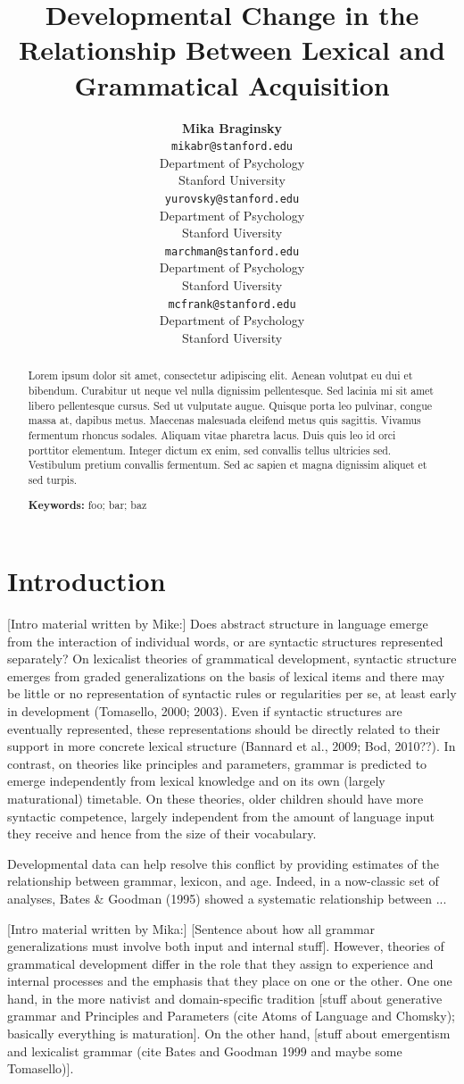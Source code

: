 \documentclass[10pt,letterpaper]{article}
\title{Developmental Change in the Relationship Between Lexical and Grammatical Acquisition}
\author{{\large \bf Mika Braginsky} \\
  \texttt{mikabr@stanford.edu} \\
  Department of Psychology \\
  Stanford University
  \And {\large \bf Daniel Yurovsky} \\
  \texttt{yurovsky@stanford.edu} \\
  Department of Psychology \\
  Stanford Uiversity
    \And {\large \bf Virginia Marchman} \\
    \texttt{marchman@stanford.edu} \\
  Department of Psychology \\
  Stanford Uiversity
    \And {\large \bf Michael C. Frank}\\
    \texttt{mcfrank@stanford.edu} \\
  Department of Psychology \\
  Stanford Uiversity}
\begin{document}
\maketitle

\begin{abstract}
Lorem ipsum dolor sit amet, consectetur adipiscing elit. Aenean volutpat eu dui et bibendum. Curabitur ut neque vel nulla dignissim pellentesque. Sed lacinia mi sit amet libero pellentesque cursus. Sed ut vulputate augue. Quisque porta leo pulvinar, congue massa at, dapibus metus. Maecenas malesuada eleifend metus quis sagittis. Vivamus fermentum rhoncus sodales. Aliquam vitae pharetra lacus. Duis quis leo id orci porttitor elementum. Integer dictum ex enim, sed convallis tellus ultricies sed. Vestibulum pretium convallis fermentum. Sed ac sapien et magna dignissim aliquet et sed turpis.

\textbf{Keywords:} 
foo; bar; baz
\end{abstract}

\section{Introduction}

[Intro material written by Mike:]
Does abstract structure in language emerge from the interaction of individual words, or are syntactic structures represented separately? On lexicalist theories of grammatical development, syntactic structure emerges from graded generalizations on the basis of lexical items and there may be little or no representation of syntactic rules or regularities per se, at least early in development (Tomasello, 2000; 2003). Even if syntactic structures are eventually represented, these representations should be directly related to their support in more concrete lexical structure (Bannard et al., 2009; Bod, 2010??). In contrast, on theories like principles and parameters, grammar is predicted to emerge independently from lexical knowledge and on its own (largely maturational) timetable. On these theories, older children should have more syntactic competence, largely independent from the amount of language input they receive and hence from the size of their vocabulary.

Developmental data can help resolve this conflict by providing estimates of the relationship between grammar, lexicon, and age. Indeed, in a now-classic set of analyses, Bates \& Goodman (1995) showed a systematic relationship between ...

[Intro material written by Mika:]
[Sentence about how all grammar generalizations must involve both input and internal stuff]. However, theories of grammatical development differ in the role that they assign to experience and internal processes and the emphasis that they place on one or the other. One one hand, in the more nativist and domain-specific tradition [stuff about generative grammar and Principles and Parameters (cite Atoms of Language and Chomsky); basically everything is maturation]. On the other hand, [stuff about emergentism and lexicalist grammar (cite Bates and Goodman 1999 and maybe some Tomasello)].
\end{document}
